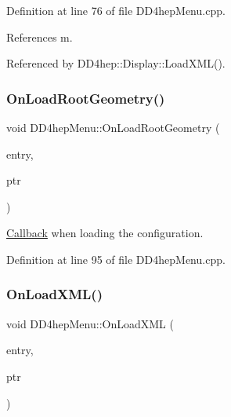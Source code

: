 Definition at line 76 of file D\+D4hep\+Menu.\+cpp.



References m.



Referenced by D\+D4hep\+::\+Display\+::\+Load\+X\+M\+L().

\hypertarget{class_d_d4hep_1_1_d_d4hep_menu_a4bc97ab3803f51bf9d271dd88781d6be}{}\label{class_d_d4hep_1_1_d_d4hep_menu_a4bc97ab3803f51bf9d271dd88781d6be} 
\subsubsection{\texorpdfstring{On\+Load\+Root\+Geometry()}{OnLoadRootGeometry()}}
{\footnotesize\ttfamily void D\+D4hep\+Menu\+::\+On\+Load\+Root\+Geometry (\begin{DoxyParamCaption}\item[{T\+G\+Menu\+Entry $\ast$}]{entry,  }\item[{void $\ast$}]{ptr }\end{DoxyParamCaption})}



\hyperlink{class_d_d4hep_1_1_callback}{Callback} when loading the configuration. 



Definition at line 95 of file D\+D4hep\+Menu.\+cpp.

\hypertarget{class_d_d4hep_1_1_d_d4hep_menu_a3bb55c2f200a4575cf4bddd720efd5ab}{}\label{class_d_d4hep_1_1_d_d4hep_menu_a3bb55c2f200a4575cf4bddd720efd5ab} 
\subsubsection{\texorpdfstring{On\+Load\+X\+M\+L()}{OnLoadXML()}}
{\footnotesize\ttfamily void D\+D4hep\+Menu\+::\+On\+Load\+X\+ML (\begin{DoxyParamCaption}\item[{T\+G\+Menu\+Entry $\ast$}]{entry,  }\item[{void $\ast$}]{ptr }\end{DoxyParamCaption})}



